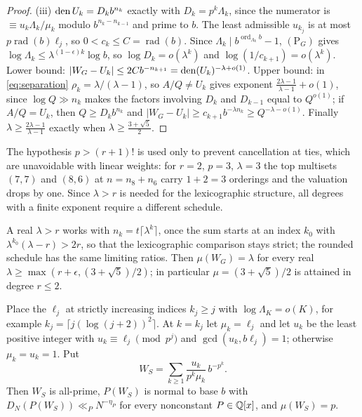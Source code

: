 \documentclass[11pt]{article}
\DeclareMathOperator{\ord}{ord}
\DeclareMathOperator{\rad}{rad}
\begin{document}
\begin{proof}
(iii) $\operatorname{den} U_k=D_kb^{n_k}$ exactly with $D_k=p^k\Lambda_k$, since the numerator is $\equiv u_k\Lambda_k/\mu_k$ modulo $b^{n_k-n_{k-1}}$ and
prime to $b$. The least admissible $u_{k_j}$ is at most $p\rad(b)\ell_j$, so $0<c_k\le C=\rad(b)$. Since
$\Lambda_k\mid b^{\ord_{\Lambda_k}b}-1$, $(\mathrm P_G)$ gives $\log\Lambda_k\le\lambda^{(1-\epsilon)k}\log b$, so $\log D_k=o(\lambda^k)$ and
$\log(1/c_{k+1})=o(\lambda^k)$. Lower bound: $|W_G-U_k|\le2Cb^{-n_{k+1}}=\operatorname{den}(U_k)^{-\lambda+o(1)}$. Upper bound: in
\eqref{eq:separation} $\rho_k=\lambda/(\lambda-1)$, so $A/Q\ne U_k$ gives exponent $\frac{2\lambda-1}{\lambda-1}+o(1)$, since $\log Q\gg n_k$ makes
the factors involving $D_k$ and $D_{k-1}$ equal to $Q^{o(1)}$; if $A/Q=U_k$, then $Q\ge D_kb^{n_k}$ and
$|W_G-U_k|\ge c_{k+1}b^{-\lambda n_k}\ge Q^{-\lambda-o(1)}$. Finally $\lambda\ge\frac{2\lambda-1}{\lambda-1}$ exactly when $\lambda\ge\frac{3+\sqrt5}2$.
\end{proof}

The hypothesis $p>(r+1)!$ is used only to prevent cancellation at ties, which are unavoidable with linear weights: for
$r=2$, $p=3$, $\lambda=3$ the top multisets $(7,7)$ and $(8,6)$ at $n=n_8+n_6$ carry $1+2=3$ orderings and the valuation
drops by one. Since $\lambda>r$ is needed for the lexicographic structure, all degrees with a finite exponent require a
different schedule.

\begin{remark}\label{rem:realratio}
A real $\lambda>r$ works with $n_k=t\lceil\lambda^k\rceil$, once the sum starts at an index $k_0$ with $\lambda^{k_0}(\lambda-r)>2r$, so that the
lexicographic comparison stays strict; the rounded schedule has the same limiting ratios. Then $\mu(W_G)=\lambda$ for every
real $\lambda\ge\max(r+\epsilon,(3+\sqrt5)/2)$; in particular $\mu=(3+\sqrt5)/2$ is attained in degree $r\le2$.
\end{remark}

\begin{theorem}\label{thm:stoneham}
Place the $\ell_j$ at strictly increasing indices $k_j\ge j$ with $\log\Lambda_K=o(K)$, for example $k_j=\lceil j(\log(j+2))^2\rceil$. At
$k=k_j$ let $\mu_k=\ell_j$ and let $u_k$ be the least positive integer with $u_k\equiv\ell_j\pmod{p^j}$ and $\gcd(u_k,b\ell_j)=1$; otherwise
$\mu_k=u_k=1$. Put
\[
W_S=\sum_{k\ge1}\frac{u_k}{p^k\mu_k}\,b^{-p^k}.
\]
Then $W_S$ is all-prime, $P(W_S)$ is normal to base $b$ with $D_N(P(W_S))\ll_PN^{-\eta_P}$ for every nonconstant $P\in\mathbb Q[x]$, and
$\mu(W_S)=p$.
\end{theorem}
\end{document}
